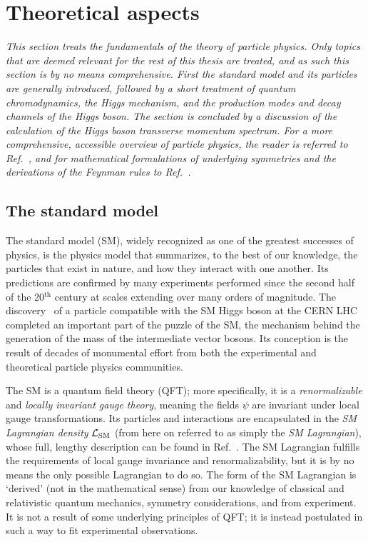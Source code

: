 \section{Theoretical aspects}

\emph{%
% 
This section treats the fundamentals of the theory of particle physics.
% 
Only topics that are deemed relevant for the rest of this thesis are treated, and as such this section is by no means comprehensive.
%
First the standard model and its particles are generally introduced, followed by a short treatment of quantum chromodynamics, the Higgs mechanism, and the production modes and decay channels of the Higgs boson.
% 
The section is concluded by a discussion of the calculation of the Higgs boson transverse momentum spectrum.
% 
For a more comprehensive, accessible overview of particle physics, the reader is referred to Ref.~\cite{griffiths}, and for mathematical formulations of underlying symmetries and the derivations of the Feynman rules to Ref.~\cite{peskin}.
}

\subsection{The standard model}
\label{sec:sm}

The standard model (SM), widely recognized as one of the greatest successes of physics, is the physics model that summarizes, to the best of our knowledge, the particles that exist in nature, and how they interact with one another.
% 
Its predictions are confirmed by many experiments performed since the second half of the 20${}^\text{th}$ century at scales extending over many orders of magnitude.
% 
The discovery~\cite{Aad:2012tfa,Chatrchyan:2012xdj,Chatrchyan:2013lba} of a particle compatible with the SM Higgs boson at the CERN LHC completed an important part of the puzzle of the SM, the mechanism behind the generation of the mass of the intermediate vector bosons.
% 
Its conception is the result of decades of monumental effort from both the experimental and theoretical particle physics communities.


The SM is a quantum field theory (QFT); more specifically, it is a \textit{renormalizable} and \textit{locally invariant gauge theory}, meaning the fields $\psi$ are invariant under local gauge transformations.
% 
Its particles and interactions are encapsulated in the \textit{SM Lagrangian density} $\mathcal{L}_\text{SM}$ (from here on referred to as simply the \textit{SM Lagrangian}), whose full, lengthy description can be found in Ref.~\cite{fullsmlagrangian}.
% 
The SM Lagrangian fulfills the requirements of local gauge invariance and renormalizability, but it is by no means the only possible Lagrangian to do so.
% 
The form of the SM Lagrangian is `derived' (not in the mathematical sense) from our knowledge of classical and relativistic quantum mechanics, symmetry considerations, and from experiment.
% 
It is not a result of some underlying principles of QFT; it is instead postulated in such a way to fit experimental observations.


